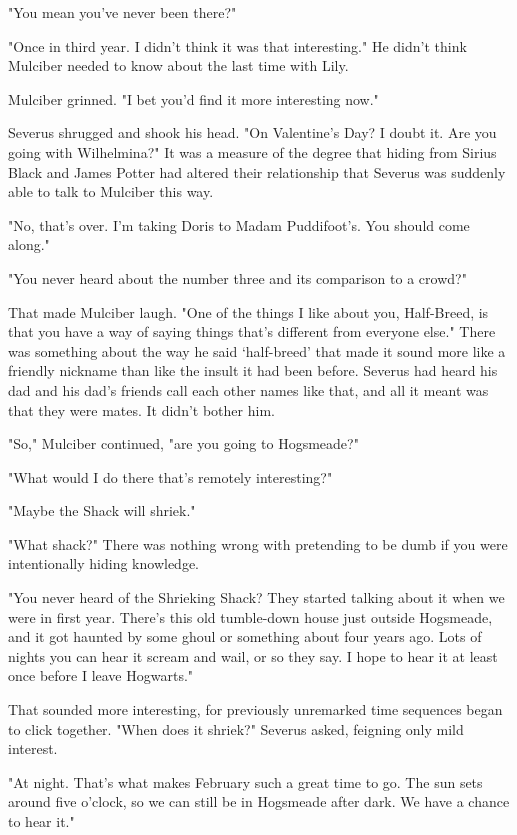 \documentclass[a4paper,11pt]{article}
\begin{document}
"You mean you've never been there?"

"Once in third year. I didn't think it was that interesting." He didn't think Mulciber needed to know about the last time with Lily.

Mulciber grinned. "I bet you'd find it more interesting now."

Severus shrugged and shook his head. "On Valentine's Day? I doubt it. Are you going with Wilhelmina?" It was a measure of the degree that hiding from Sirius Black and James Potter had altered their relationship that Severus was suddenly able to talk to Mulciber this way.

"No, that's over. I'm taking Doris to Madam Puddifoot's. You should come along."

"You never heard about the number three and its comparison to a crowd?"

That made Mulciber laugh. "One of the things I like about you, Half-Breed, is that you have a way of saying things that's different from everyone else." There was something about the way he said `half-breed' that made it sound more like a friendly nickname than like the insult it had been before. Severus had heard his dad and his dad's friends call each other names like that, and all it meant was that they were mates. It didn't bother him.

"So," Mulciber continued, "are you going to Hogsmeade?"

"What would I do there that's remotely interesting?"

"Maybe the Shack will shriek."

"What shack?" There was nothing wrong with pretending to be dumb if you were intentionally hiding knowledge.

"You never heard of the Shrieking Shack? They started talking about it when we were in first year. There's this old tumble-down house just outside Hogsmeade, and it got haunted by some ghoul or something about four years ago. Lots of nights you can hear it scream and wail, or so they say. I hope to hear it at least once before I leave Hogwarts."

That sounded more interesting, for previously unremarked time sequences began to click together. "When does it shriek?" Severus asked, feigning only mild interest.

"At night. That's what makes February such a great time to go. The sun sets around five o'clock, so we can still be in Hogsmeade after dark. We have a chance to hear it."
\end{document}
